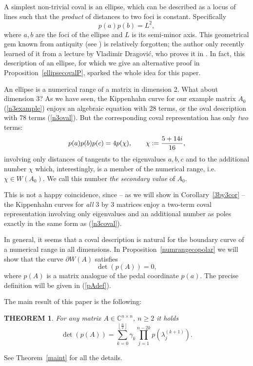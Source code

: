 \documentclass[10pt,a4paper,reqno]{amsart}
\newtheorem{theorem}[defi]{\bf T\scriptsize HEOREM \normalsize}
\newcommand{\zav}[1]{\left( #1 \right)}
\newcommand{\imag}{{\rm i}}
\newcommand{\deter}[1]{\det\zav{#1}}
\newcommand{\trunc}[1]{\left\lfloor #1 \right\rfloor}
\begin{document}
A simplest non-trivial coval is an ellipse, which can be described as a locus of lines such that the \textit{product} of distances to two foci is constant. Specifically
$$
p(a)p(b)=L^2,
$$
where $a,b$ are the foci of the ellipse and $L$ is its semi-minor axis. This geometrical gem known from antiquity (see \cite{lockwood}) is relatively forgotten; the author only recently learned of it from a lecture by Vladimir Dragovi\'c, who proves it in \cite[Lemma 3.1.]{Dragovic}. In fact, this description of an ellipse, for which we give an alternative proof in Proposition~\ref{ellipsecovalP}, sparked the whole idea for this paper.  

An ellipse is a numerical range of a matrix in dimension 2. What about dimension 3? As we have seen, the Kippenhahn curve for our example matrix $A_0$ (\ref{n3example}) enjoys an algebraic equation with $28$ terms, or the oval description with 78 terms (\ref{n3oval}). But the corresponding coval representation has only \textit{two} terms: 
\begin{equation}\label{n3coval}
p(a)p(b)p(c)=4p(\chi),\qquad \chi:=\frac{5+14\imag}{16},
\end{equation} 
involving only distances of tangents to the eigenvalues $a,b,c$ and to the additional number $\chi$ which, interestingly, is a member of the numerical range, i.e. $\chi\in W(A_0)$. We call this number \textit{the secondary value} of $A_0$.

This is not a happy coincidence, since -- as we will show in Corollary~\ref{3by3cor} -- the Kippenhahn curves for \textit{all} 3 by 3 matrices enjoy a two-term coval representation involving only eigenvalues and an additional number as poles exactly in the same form as (\ref{n3coval}).

In general, it seems that a coval description is natural for the boundary curve of a numerical range in all dimensions. In Proposition~\ref{numrangecopolar} we will show that the curve $\partial W(A)$ satisfies
\begin{equation}
\deter{p(A)}=0,
\end{equation} 
where $p(A)$ is a matrix analogue of the pedal coordinate $p(a)$. The precise definition will be given in (\ref{pAdef}). 

The main result of this paper is the following:
\begin{theorem}\label{maintint}
For any matrix $A\in\mathbb{C}^{n\times n}$, $n\geq 2$ it holds
\begin{equation}\label{covalpaint}
\deter{p(A)}=\sum_{k=0}^{\trunc{\frac{n}{2}}}\gamma_k\prod_{j=1}^{n-2k}p\zav{\lambda^{(k+1)}_{j}}.
\end{equation}
\end{theorem}
See Theorem~\ref{maint} for all the details.
\end{document}

